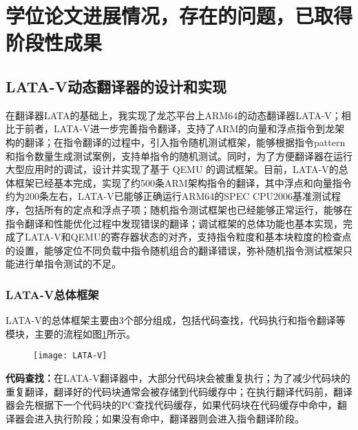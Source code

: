 \section{学位论文进展情况，存在的问题，已取得阶段性成果}
\subsection{LATA-V动态翻译器的设计和实现}
在翻译器LATA的基础上，我实现了龙芯平台上ARM64的动态翻译器LATA-V；相比于前者，LATA-V进一步完善指令翻译，支持了ARM的向量和浮点指令到龙架构的翻译；在指令翻译的过程中，引入指令随机测试框架，能够根据指令pattern和指令数量生成测试案例，支持单指令的随机测试。同时，为了方便翻译器在运行大型应用时的调试，设计并实现了基于 QEMU 的调试框架。目前，LATA-V的总体框架已经基本完成，实现了约500条ARM架构指令的翻译，其中浮点和向量指令约为200条左右，LATA-V已能够正确运行ARM64的SPEC CPU2006基准测试程序，包括所有的定点和浮点子项；随机指令测试框架也已经能够正常运行，能够在指令翻译和性能优化过程中发现错误的翻译；调试框架的总体功能也基本实现，完成了LATA-V和QEMU的寄存器状态的对齐，支持指令粒度和基本块粒度的检查点的设置，能够定位不同负载中指令随机组合的翻译错误，弥补随机指令测试框架只能进行单指令测试的不足。
\subsubsection{LATA-V总体框架}
LATA-V的总体框架主要由3个部分组成，包括代码查找，代码执行和指令翻译等模块，主要的流程如图\ref{fig:LATA-V}所示。

\begin{figure}[!htbp]
    \centering
    \texttt{[image: LATA-V]}
    \label{fig:LATA-V}
\end{figure}
\textbf{代码查找：}在LATA-V翻译器中，大部分代码块会被重复执行；为了减少代码块的重复翻译，翻译好的代码块通常会被存储到代码缓存中；在执行翻译代码前，翻译器会先根据下一个代码块的PC查找代码缓存，如果代码块在代码缓存中命中，翻译器会进入执行阶段；如果没有命中，翻译器则会进入指令翻译阶段。

